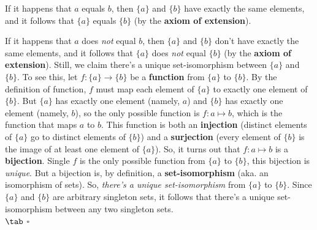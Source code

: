 If it happens that $a$ equals $b$, then $\{a\}$ and $\{b\}$ have exactly the same elements, and
it follows that $\{a\}$ equals $\{b\}$ (by the {\bf axiom of extension}).

If it happens that $a$ does {\it not} equal $b$, then $\{a\}$ and $\{b\}$ don't have exactly the same elements,
and it follows that $\{a\}$ does {\it not} equal $\{b\}$ (by the {\bf axiom of extension}).
Still, we claim there's a unique set-isomorphism between $\{a\}$ and $\{b\}$.
To see this, let $f: \{a\} \to \{b\}$ be a {\bf function} from $\{a\}$ to $\{b\}$.
By the definition of function, $f$ must map each element of $\{a\}$ to exactly one element of $\{b\}$.
But $\{a\}$ has exactly one element (namely, $a$) and $\{b\}$ has exactly one element (namely, $b$), so the only possible function is $f : a \mapsto b$,
which is the function that maps $a$ to $b$.
This function is both an {\bf injection} (distinct elements of $\{a\}$ go to distinct elements of $\{b\}$) and
a {\bf surjection} (every element of $\{b\}$ is the image of at least one element of $\{a\}$).
So, it turns out that $f: a \mapsto b$ is a {\bf bijection}.
Single $f$ is the only possible function from $\{a\}$ to $\{b\}$, this bijection is {\it unique}.
But a bijection is, by definition, a {\bf set-isomorphism} (aka. an isomorphism of sets).
So, {\it there's a unique set-isomorphism} from $\{a\}$ to $\{b\}$.
Since $\{a\}$ and $\{b\}$ are arbitrary singleton sets, it follows that there's a unique set-isomorphism between any two singleton sets. \\
$\tab$ $\square$
